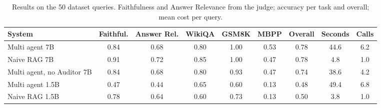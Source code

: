 \begin{table}[!tb]
\centering
\caption{Results on the 50 dataset queries. Faithfulness and Answer Relevance from the judge; accuracy per task and overall; mean cost per query.}
\label{tab:main}
\footnotesize
\setlength{\tabcolsep}{3.5pt}
\begin{tabular}{lcccccccc}
\toprule
System & Faithful. & Answer Rel. & WikiQA & GSM8K & MBPP & Overall & Seconds & Calls \\
\midrule
Multi agent 7B & 0.84 & 0.68 & 0.80 & 1.00 & 0.53 & 0.78 & 44.6 & 6.2 \\
Naive RAG 7B & 0.91 & 0.72 & 0.85 & 1.00 & 0.47 & 0.78 & 4.8 & 1.0 \\
Multi agent, no Auditor 7B & 0.84 & 0.68 & 0.80 & 0.93 & 0.47 & 0.74 & 38.6 & 4.2 \\
Multi agent 1.5B & 0.47 & 0.44 & 0.65 & 0.60 & 0.13 & 0.48 & 49.4 & 6.8 \\
Naive RAG 1.5B & 0.78 & 0.64 & 0.60 & 0.73 & 0.13 & 0.50 & 3.8 & 1.0 \\
\bottomrule
\end{tabular}
\end{table}
